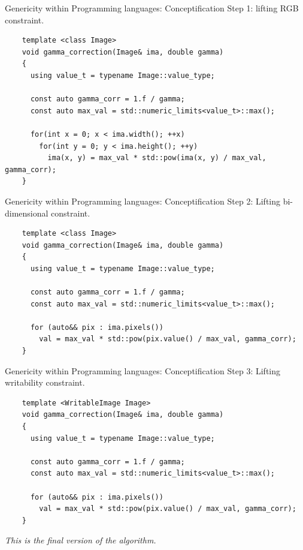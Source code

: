 \documentclass[12pt,aspectratio=169]{beamer}
\begin{document}
\begin{frame}[fragile]{Genericity within Programming languages: Conceptification}
  Step 1: lifting RGB constraint.
  \vfill
  \begin{verbatim}
    template <class Image>
    void gamma_correction(Image& ima, double gamma)
    {
      using value_t = typename Image::value_type;

      const auto gamma_corr = 1.f / gamma;
      const auto max_val = std::numeric_limits<value_t>::max();
    
      for(int x = 0; x < ima.width(); ++x)
        for(int y = 0; y < ima.height(); ++y)
          ima(x, y) = max_val * std::pow(ima(x, y) / max_val, gamma_corr);
    }
  \end{verbatim}
\end{frame}

\begin{frame}[fragile]{Genericity within Programming languages: Conceptification}
  Step 2: Lifting bi-dimensional constraint.
  \vfill
  \begin{verbatim}
    template <class Image>
    void gamma_correction(Image& ima, double gamma)
    {
      using value_t = typename Image::value_type;

      const auto gamma_corr = 1.f / gamma;
      const auto max_val = std::numeric_limits<value_t>::max();
    
      for (auto&& pix : ima.pixels())
        val = max_val * std::pow(pix.value() / max_val, gamma_corr);
    }
  \end{verbatim}
\end{frame}

\begin{frame}[fragile]{Genericity within Programming languages: Conceptification}
  Step 3: Lifting writability constraint.
  \vfill
  \begin{verbatim}
    template <WritableImage Image>
    void gamma_correction(Image& ima, double gamma)
    {
      using value_t = typename Image::value_type;
    
      const auto gamma_corr = 1.f / gamma;
      const auto max_val = std::numeric_limits<value_t>::max();
    
      for (auto&& pix : ima.pixels())
        val = max_val * std::pow(pix.value() / max_val, gamma_corr);
    }
  \end{verbatim}
  \vfill
  \centering\emph{This is the final version of the algorithm.}
\end{frame}
\end{document}
